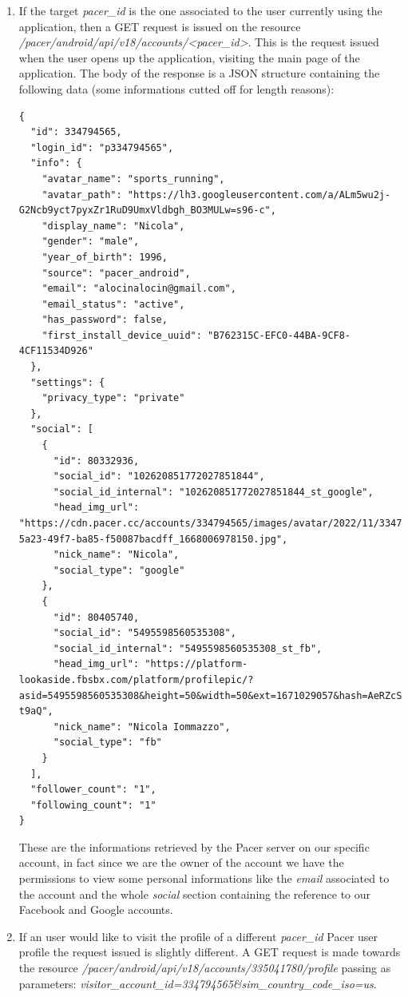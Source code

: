 			\begin{enumerate}
				\item If the target \textit{pacer\_id} is the one associated to the user currently using the application, then a GET request is issued on the resource \textit{/pacer/android/api/v18/accounts/<pacer\_id>}. This is the request issued when the user opens up the application, visiting the main page of the application. The body of the response is a JSON structure containing the following data (some informations cutted off for length reasons):
\begin{lstlisting}
{
  "id": 334794565,
  "login_id": "p334794565",
  "info": {
    "avatar_name": "sports_running",
    "avatar_path": "https://lh3.googleusercontent.com/a/ALm5wu2j-G2Ncb9yct7pyxZr1RuD9UmxVldbgh_BO3MULw=s96-c",
    "display_name": "Nicola",
    "gender": "male",
    "year_of_birth": 1996,
    "source": "pacer_android",
    "email": "alocinalocin@gmail.com",
    "email_status": "active",
    "has_password": false,
    "first_install_device_uuid": "B762315C-EFC0-44BA-9CF8-4CF11534D926"
  },
  "settings": {
    "privacy_type": "private"
  },
  "social": [
    {
      "id": 80332936,
      "social_id": "102620851772027851844",
      "social_id_internal": "102620851772027851844_st_google",
      "head_img_url": "https://cdn.pacer.cc/accounts/334794565/images/avatar/2022/11/334794565_af56c5f9-5a23-49f7-ba85-f50087bacdff_1668006978150.jpg",
      "nick_name": "Nicola",
      "social_type": "google"
    },
    {
      "id": 80405740,
      "social_id": "5495598560535308",
      "social_id_internal": "5495598560535308_st_fb",
      "head_img_url": "https://platform-lookaside.fbsbx.com/platform/profilepic/?asid=5495598560535308&height=50&width=50&ext=1671029057&hash=AeRZcSELt4mZ1V-t9aQ",
      "nick_name": "Nicola Iommazzo",
      "social_type": "fb"
    }
  ],
  "follower_count": "1",
  "following_count": "1"
}
\end{lstlisting}
				These are the informations retrieved by the Pacer server on our specific account, in fact since we are the owner of the account we have the permissions to view some personal informations like the \textit{email} associated to the account and the whole \textit{social} section containing the reference to our Facebook and Google accounts.
				\item If an user would like to visit the profile of a different \textit{pacer\_id} Pacer user profile the request issued is slightly different. A GET request is made towards the resource \textit{/pacer/android/api/v18/accounts/335041780/profile} passing as parameters: \newline \textit{visitor\_account\_id=334794565\&sim\_country\_code\_iso=us}. \newline

\end{enumerate}
